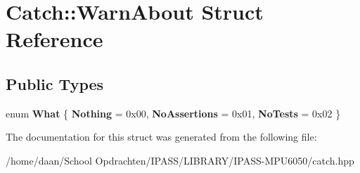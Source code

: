 \hypertarget{structCatch_1_1WarnAbout}{}\section{Catch\+:\+:Warn\+About Struct Reference}
\label{structCatch_1_1WarnAbout}
\subsection*{Public Types}
\begin{DoxyCompactItemize}
\item 
\mbox{\label{structCatch_1_1WarnAbout_ae3dde70ef78d700ea896eb29314e0fa3}} 
enum {\bfseries What} \{ {\bfseries Nothing} = 0x00, 
{\bfseries No\+Assertions} = 0x01, 
{\bfseries No\+Tests} = 0x02
 \}
\end{DoxyCompactItemize}


The documentation for this struct was generated from the following file\+:\begin{DoxyCompactItemize}
\item 
/home/daan/\+School Opdrachten/\+I\+P\+A\+S\+S/\+L\+I\+B\+R\+A\+R\+Y/\+I\+P\+A\+S\+S-\/\+M\+P\+U6050/catch.\+hpp\end{DoxyCompactItemize}
